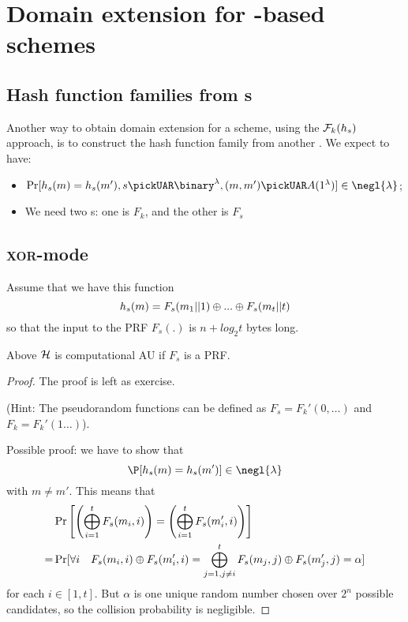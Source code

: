
\section{Domain extension for \prf-based \mac{} schemes}

\subsection{Hash function families from \prf{}s}

Another way to obtain domain extension for a \mac{} scheme, using the $\mathcal{F}_k(h_s)$ approach, is to construct the hash function family from another \prf{}. We expect to have:
\begin{itemize}
    \item $\Pr[h_s(m) = h_s(m'), s \pickUAR \binary^\lambda, (m, m') \pickUAR A(1^\lambda)] \in \negl{\lambda}$;
    \item We need two \prf{}s: one is $F_{k}$, and the other is $F_{s}$
\end{itemize}

\subsection{\textsc{xor}-mode}

Assume that we have this function
\[
    h_{s}(m)=F_{s}(m_{1}||1) \oplus ... \oplus F_{s}(m_{t}||t)
\]
so that the input to the PRF $F_{s}(.)$ is $n + log_{2} t$ bytes long.

\begin{lemma}
    Above $\mathcal{H}$ is computational AU if $F_s$ is a PRF.
\end{lemma}

\begin{proof} The proof is left as exercise.

    (Hint: The pseudorandom functions can be defined as $F_s = F_k'(0, \dots)$ and $F_k = F_k'(1 \dots)$).
    
    Possible proof: we have to show that
    \[
        \P [ h_{s}(m)=h_{s}(m') ] \in \negl{\lambda}   
    \]
    with $m \neq m'$. This means that 
    \begin{align*}
        &\Pr\left[\left(\bigoplus_{i = 1}^{t} F_s(m_i, i)\right) = \left(\bigoplus_{i = 1}^{t} F_s(m_i', i)\right)\right] \\
        = &\Pr[\forall i \quad F_s(m_i, i) \oplus F_s(m'_i, i) = \bigoplus_{j = 1, j \neq i}^{t} F_s(m_j, j) \oplus F_s(m'_j, j) = \alpha]
    \end{align*}
    for each $i \in [1,t]$. But $\alpha$ is one unique random number chosen over $2^{n}$ possible candidates, so the collision probability is negligible.
    
\end{proof}

